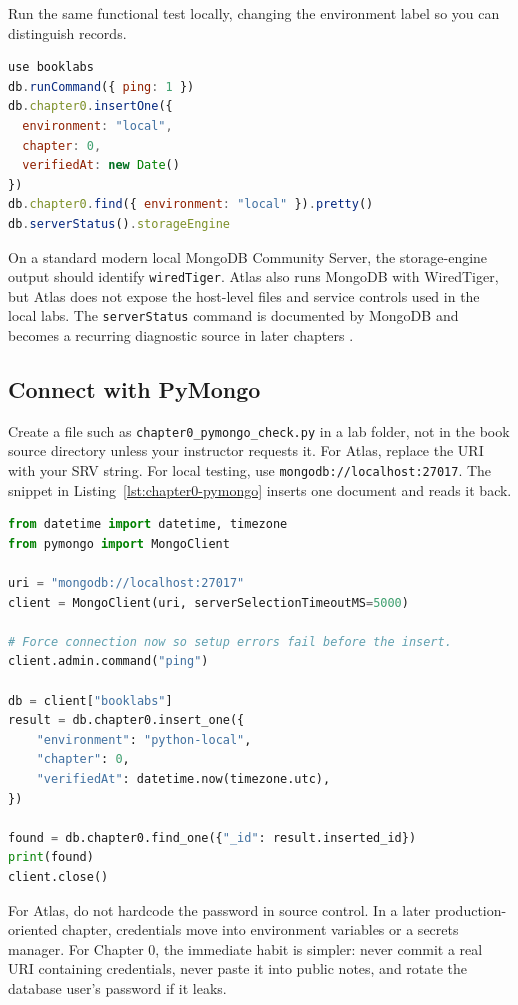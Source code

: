 Run the same functional test locally, changing the environment label so you can distinguish records.

\begin{lstlisting}[language=JavaScript, caption={Local insert, find, and storage-engine check.}]
use booklabs
db.runCommand({ ping: 1 })
db.chapter0.insertOne({
  environment: "local",
  chapter: 0,
  verifiedAt: new Date()
})
db.chapter0.find({ environment: "local" }).pretty()
db.serverStatus().storageEngine
\end{lstlisting}

On a standard modern local MongoDB Community Server, the storage-engine output should identify \texttt{wiredTiger}. Atlas also runs MongoDB with WiredTiger, but Atlas does not expose the host-level files and service controls used in the local labs. The \texttt{serverStatus} command is documented by MongoDB and becomes a recurring diagnostic source in later chapters \cite{mongodbServerStatusDocs}.

\subsection{Connect with PyMongo}
Create a file such as \texttt{chapter0\_pymongo\_check.py} in a lab folder, not in the book source directory unless your instructor requests it. For Atlas, replace the URI with your SRV string. For local testing, use \texttt{mongodb://localhost:27017}. The snippet in Listing~\ref{lst:chapter0-pymongo} inserts one document and reads it back.

\begin{lstlisting}[language=Python, caption={Minimal PyMongo insert and find check.}, label={lst:chapter0-pymongo}]
from datetime import datetime, timezone
from pymongo import MongoClient

uri = "mongodb://localhost:27017"
client = MongoClient(uri, serverSelectionTimeoutMS=5000)

# Force connection now so setup errors fail before the insert.
client.admin.command("ping")

db = client["booklabs"]
result = db.chapter0.insert_one({
    "environment": "python-local",
    "chapter": 0,
    "verifiedAt": datetime.now(timezone.utc),
})

found = db.chapter0.find_one({"_id": result.inserted_id})
print(found)
client.close()
\end{lstlisting}

For Atlas, do not hardcode the password in source control. In a later production-oriented chapter, credentials move into environment variables or a secrets manager. For Chapter 0, the immediate habit is simpler: never commit a real URI containing credentials, never paste it into public notes, and rotate the database user's password if it leaks.

